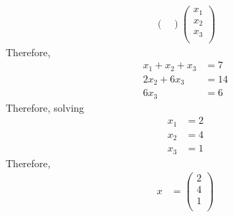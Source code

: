 \documentclass[fleqn, a4paper, 11pt, oneside]{amsart}
\theoremstyle{definition}
\theoremstyle{theorem}
\begin{document}
\begin{solution}
\begin{enumerate}[leftmargin=*]
\begin{align*}
\begin{pmatrix}
					\end{pmatrix}
					\begin{pmatrix}
						x_1 \\
						x_2 \\
						x_3 \\
					\end{pmatrix}
			\end{align*}
			Therefore,
			\begin{align*}
				x_1 + x_2 + x_3 & = 7  \\
				2 x_2 + 6 x_3   & = 14 \\
				6 x_3           & = 6
			\end{align*}
			Therefore, solving
			\begin{align*}
				x_1 & = 2 \\
				x_2 & = 4 \\
				x_3 & = 1
			\end{align*}
			Therefore,
			\begin{align*}
				x &=
					\begin{pmatrix}
						2 \\
						4 \\
						1 \\
					\end{pmatrix}
			\end{align*}
	\end{enumerate}
\end{solution}
\end{document}
